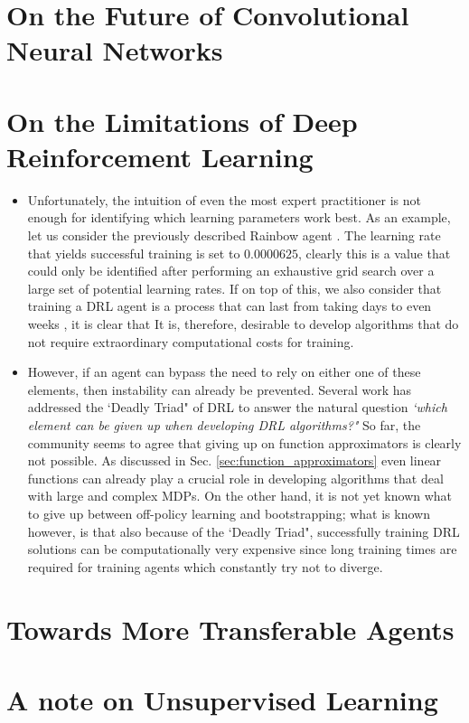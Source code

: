 \section{On the Future of Convolutional Neural Networks}


\section{On the Limitations of Deep Reinforcement Learning}

\begin{itemize}
\item Unfortunately, the intuition of even the most expert practitioner is not enough for identifying which learning parameters work best. As an example, let us consider the previously described Rainbow agent \cite{hessel2018rainbow}. The learning rate that yields successful training is set to $0.0000625$, clearly this is a value that could only be identified after performing an exhaustive grid search over a large set of potential learning rates. If on top of this, we also consider that training a DRL agent is a process that can last from taking days to even weeks \cite{kaiser2019model}, it is clear that  It is, therefore, desirable to develop algorithms that do not require extraordinary computational costs for training.
\item However, if an agent can bypass the need to rely on either one of these elements, then instability can already be prevented. Several work has addressed the `Deadly Triad" of DRL \cite{van2018deep_triad,hernandez2019understanding,fedus2020revisiting} to answer the natural question \textit{`which element can be given up when developing DRL algorithms?"} So far, the community seems to agree that giving up on function approximators is clearly not possible. As discussed in Sec. \ref{sec:function_approximators} even linear functions can already play a crucial role in developing algorithms that deal with large and complex MDPs. On the other hand, it is not yet known what to give up between off-policy learning and bootstrapping; what is known however, is that also because of the `Deadly Triad", successfully training DRL solutions can be computationally very expensive since long training times are required for training agents which constantly try not to diverge. 
\end{itemize}


\section{Towards More Transferable Agents}



\section{A note on Unsupervised Learning}
